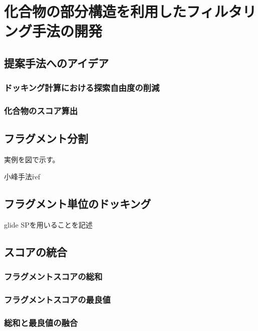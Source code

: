 \chapter{化合物の部分構造を利用したフィルタリング手法の開発}


\section{提案手法へのアイデア}
\subsection{ドッキング計算における探索自由度の削減}
\subsection{化合物のスコア算出}

\section{フラグメント分割}
実例を図で示す。

小峰手法\r{ref}
\section{フラグメント単位のドッキング}
glide SPを用いることを記述
\section{スコアの統合}
\subsection{フラグメントスコアの総和}
\subsection{フラグメントスコアの最良値}
\subsection{総和と最良値の融合}